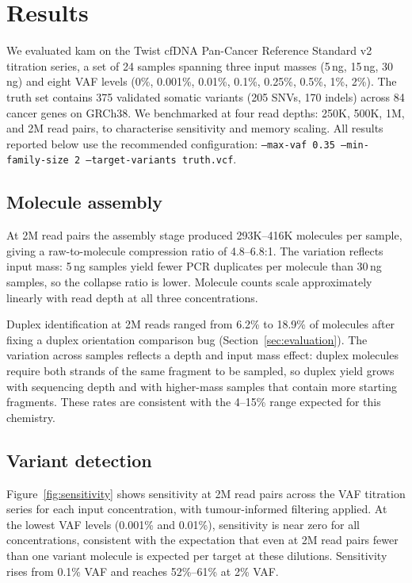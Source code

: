 \section{Results}
\label{sec:results}

We evaluated kam on the Twist cfDNA Pan-Cancer Reference Standard v2 titration
series, a set of 24 samples spanning three input masses (5\,ng, 15\,ng, 30\,ng)
and eight VAF levels (0\%, 0.001\%, 0.01\%, 0.1\%, 0.25\%, 0.5\%, 1\%, 2\%).
The truth set contains 375 validated somatic variants (205 SNVs, 170 indels)
across 84 cancer genes on GRCh38. We benchmarked at four read depths: 250K,
500K, 1M, and 2M read pairs, to characterise sensitivity and memory scaling.
All results reported below use the recommended configuration:
\texttt{--max-vaf 0.35 --min-family-size 2 --target-variants truth.vcf}.

\subsection{Molecule assembly}

At 2M read pairs the assembly stage produced 293K--416K molecules per sample,
giving a raw-to-molecule compression ratio of 4.8--6.8:1. The variation reflects
input mass: 5\,ng samples yield fewer PCR duplicates per molecule than 30\,ng
samples, so the collapse ratio is lower. Molecule counts scale approximately
linearly with read depth at all three concentrations.

Duplex identification at 2M reads ranged from 6.2\% to 18.9\% of molecules
after fixing a duplex orientation comparison bug (Section~\ref{sec:evaluation}).
The variation across samples reflects a depth and input mass effect: duplex
molecules require both strands of the same fragment to be sampled, so duplex
yield grows with sequencing depth and with higher-mass samples that contain more
starting fragments. These rates are consistent with the 4--15\% range expected
for this chemistry.

\subsection{Variant detection}

Figure~\ref{fig:sensitivity} shows sensitivity at 2M read pairs across the VAF
titration series for each input concentration, with tumour-informed filtering applied.
At the lowest VAF levels (0.001\% and 0.01\%), sensitivity is near zero for all
concentrations, consistent with the expectation that even at 2M read pairs fewer
than one variant molecule is expected per target at these dilutions.
Sensitivity rises from 0.1\% VAF and reaches 52\%--61\% at 2\% VAF.

